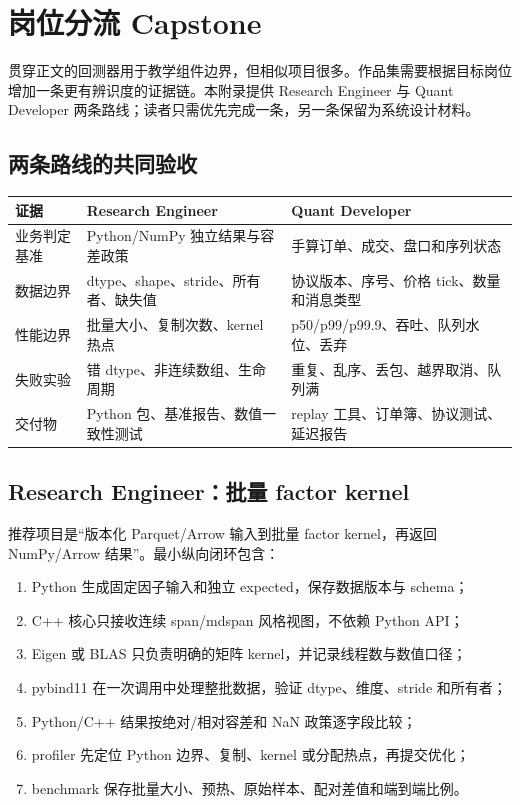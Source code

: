 \chapter{岗位分流 Capstone}

贯穿正文的回测器用于教学组件边界，但相似项目很多。作品集需要根据目标岗位增加一条更有辨识度的证据链。本附录提供 Research Engineer 与 Quant Developer 两条路线；读者只需优先完成一条，另一条保留为系统设计材料。

\section{两条路线的共同验收}

\begin{center}
\small
\begin{tabularx}{\textwidth}{p{}X X}
\toprule
证据 & Research Engineer & Quant Developer \\
\midrule
业务判定基准 & Python/NumPy 独立结果与容差政策 & 手算订单、成交、盘口和序列状态 \\
数据边界 & dtype、shape、stride、所有者、缺失值 & 协议版本、序号、价格 tick、数量和消息类型 \\
性能边界 & 批量大小、复制次数、kernel 热点 & p50/p99/p99.9、吞吐、队列水位、丢弃 \\
失败实验 & 错 dtype、非连续数组、生命周期 & 重复、乱序、丢包、越界取消、队列满 \\
交付物 & Python 包、基准报告、数值一致性测试 & replay 工具、订单簿、协议测试、延迟报告 \\
\bottomrule
\end{tabularx}
\end{center}

\section{Research Engineer：批量 factor kernel}

推荐项目是“版本化 Parquet/Arrow 输入到批量 factor kernel，再返回 NumPy/Arrow 结果”。最小纵向闭环包含：

\begin{enumerate}
  \item Python 生成固定因子输入和独立 expected，保存数据版本与 schema；
  \item C++ 核心只接收连续 span/mdspan 风格视图，不依赖 Python API；
  \item Eigen 或 BLAS 只负责明确的矩阵 kernel，并记录线程数与数值口径；
  \item pybind11 在一次调用中处理整批数据，验证 dtype、维度、stride 和所有者；
  \item Python/C++ 结果按绝对/相对容差和 NaN 政策逐字段比较；
  \item profiler 先定位 Python 边界、复制、kernel 或分配热点，再提交优化；
  \item benchmark 保存批量大小、预热、原始样本、配对差值和端到端比例。
\end{enumerate}

